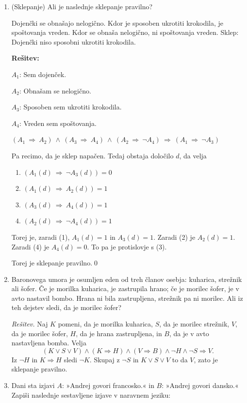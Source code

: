 \documentclass[11pt,paper=b5,DIV=13,headinclude,footinclude]{scrbook}
\def\inn {{~\wedge~}}
\def\sledi {{~\Rightarrow~}}
\begin{document}
\begin{enumerate}
\bigskip

\item (Sklepanje)
Ali je naslednje sklepanje pravilno?

Dojenčki se obnašajo nelogično. Kdor je sposoben ukrotiti krokodila, je spoštovanja vreden.
Kdor se obnaša nelogično, ni spoštovanja vreden. Sklep: Dojenčki niso sposobni ukrotiti krokodila.


\textbf{Rešitev:}

$A_1$: Sem dojenček.

$A_2$: Obnašam se nelogično.

$A_3$: Sposoben sem ukrotiti krokodila.

$A_4$: Vreden sem spoštovanja.

$(A_1\sledi A_2)\inn (A_3\sledi A_4) \inn (A_2\sledi \neg A_4)\sledi (A_1\sledi \neg A_3)$

Pa recimo, da je sklep napačen. Tedaj obstaja določilo $d$, da velja
\begin{enumerate}[(1)]
  \item $(A_1(d)\sledi \neg A_3(d)) = 0$
  \item $(A_1(d)\sledi A_2(d)) = 1$
  \item $(A_3(d)\sledi A_4(d)) = 1$
  \item $(A_2(d)\sledi \neg A_4(d)) = 1$
\end{enumerate}
Torej je, zaradi (1), $A_1(d) = 1$ in $A_3(d) = 1$. Zaradi (2) je $A_2(d) = 1$.
Zaradi (4) je $A_4(d) = 0$. To pa je protislovje s (3).

Torej je sklepanje pravilno.\qed

\item Baronovega umora je osumljen eden od treh članov osebja: kuharica,
strežnik ali šofer. Če je morilka kuharica, je zastrupila hrano; če je morilec
šofer, je v avto nastavil bombo. Hrana ni bila zastrupljena, strežnik pa ni
morilec. Ali iz teh dejstev sledi, da je morilec šofer?

\emph{Rešitev.} Naj $K$ pomeni, da je morilka kuharica, $S$, da je morilec
strežnik, $V$, da je morilec šofer, $H$, da je hrana zastrupljena, in $B$,
da je v avto nastavljena bomba. Velja
$$
(K\lor S\lor V)\land(K\Rightarrow H)\land(V\Rightarrow B)
\land\neg H\land\neg S\Rightarrow V.
$$
Iz $\neg H$ in $K\Rightarrow H$ sledi $\neg K$. Skupaj z $\neg S$ in
$K\lor S\lor V$ to da $V$, zato je sklepanje pravilno.


\item
{\color{blue}
Dani sta izjavi $A$: »Andrej govori francosko.« in $B$: »Andrej govori
dansko.« Zapiši naslednje sestavljene izjave v naravnem jeziku:

}
\end{enumerate}
\end{document}
